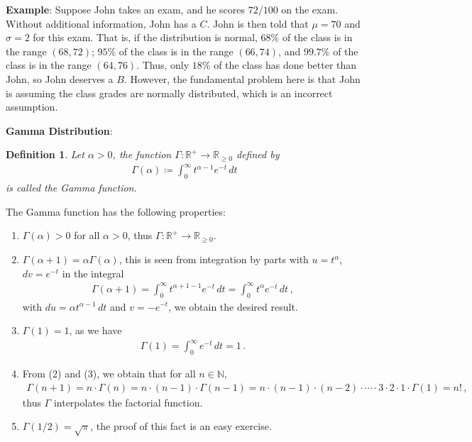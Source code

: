 \documentclass[11pt,oneside]{book}
\theoremstyle{newStyle}
\newtheorem{defn}[thm]{Definition}
\newcommand{\R}{\mathbb{R}}
\newcommand{\N}{\mathbb{N}}
\begin{document}
\textbf{Example}: Suppose John takes an exam, and he scores $72/100$ on the exam. Without additional information, John has a $C$. John is then told that $\mu = 70$ and $\sigma = 2$ for this exam. That is, if the distribution is normal, $68\%$ of the class is in the range $(68,72)$; $95\%$ of the class is in the range $(66,74)$, and $99.7\%$ of the class is in the range $(64,76)$. Thus, only $18\%$ of the class has done better than John, so John deserves a $B$. However, the fundamental problem here is that John is assuming the class grades are normally distributed, which is an incorrect assumption. \\

\hfill\break
\hfill\break


\textbf{Gamma Distribution}:
\begin{defn}
Let $\alpha >0$, the function $\Gamma:\R^+\to \R_{\geq 0}$ defined by 
\begin{align*}
\Gamma(\alpha) \coloneqq \int_0^\infty t^{\alpha-1} e^{-t}\, dt
\end{align*}
is called the Gamma function. 
\end{defn} 
The Gamma function has the following properties:
\begin{enumerate}
\item $\Gamma(\alpha) >0$ for all $\alpha>0$, thus $\Gamma:\R^+ \to \R_{\geq 0}$. 
\item $\Gamma(\alpha+1) = \alpha \Gamma(\alpha)$, this is seen from integration by parts with $u = t^\alpha$, $dv = e^{-t}$ in the integral
\begin{align*}
\Gamma(\alpha+1) = \int_0^\infty t^{\alpha+1-1}e^{-t}\, dt = \int_0^\infty t^{\alpha} e^{-t}\, dt\,,
\end{align*}
with $du = \alpha t^{\alpha-1}\, dt$ and $v = -e^{-t}$, we obtain the desired result. 
\item $\Gamma(1) = 1$, as we have
\begin{align*}
\Gamma(1) = \int_{0}^\infty e^{-t}\, dt = 1\,.
\end{align*}
\item From (2) and (3), we obtain that for all $n \in \N$, 
\begin{align*}
\Gamma(n+1) = n \cdot \Gamma(n) = n\cdot (n-1) \cdot \Gamma(n-1)  = n\cdot (n-1)\cdot (n-2) \cdot \cdots \cdot 3 \cdot 2 \cdot 1 \cdot \Gamma(1) = n!\,,
\end{align*}
thus $\Gamma$ interpolates the factorial function.
\item $\Gamma(1/2) = \sqrt{\pi}$, the proof of this fact is an easy exercise. 
\end{enumerate}
\end{document}
